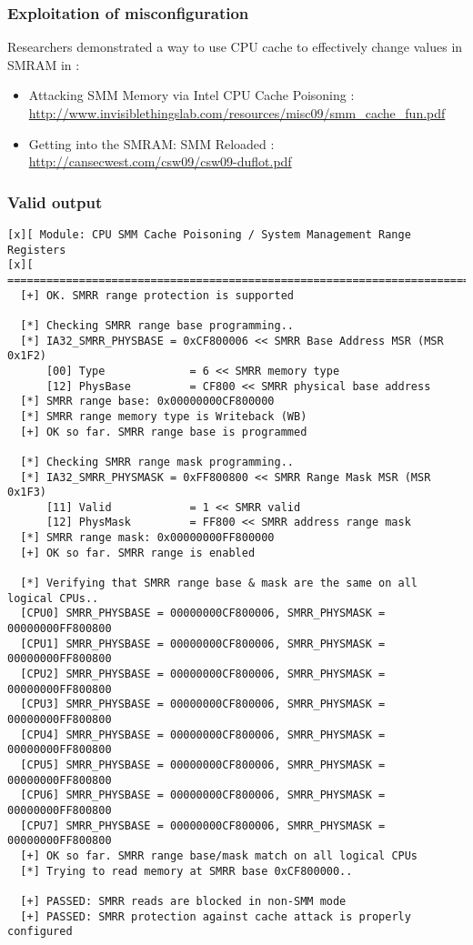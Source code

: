 \hypertarget{exploitation-of-misconfiguration-2}{%
\subsubsection{Exploitation of
misconfiguration}\label{exploitation-of-misconfiguration-2}}

Researchers demonstrated a way to use CPU cache to effectively change
values in SMRAM in :

\begin{itemize}
\tightlist
\item
  Attacking SMM Memory via Intel CPU Cache Poisoning :
  \url{http://www.invisiblethingslab.com/resources/misc09/smm_cache_fun.pdf}
\item
  Getting into the SMRAM: SMM Reloaded :
  \url{http://cansecwest.com/csw09/csw09-duflot.pdf}
\end{itemize}

\hypertarget{valid-output-6}{%
\subsubsection{Valid output}\label{valid-output-6}}

\begin{verbatim}
[x][ Module: CPU SMM Cache Poisoning / System Management Range Registers
[x][ =======================================================================
  [+] OK. SMRR range protection is supported

  [*] Checking SMRR range base programming..
  [*] IA32_SMRR_PHYSBASE = 0xCF800006 << SMRR Base Address MSR (MSR 0x1F2)
      [00] Type             = 6 << SMRR memory type 
      [12] PhysBase         = CF800 << SMRR physical base address 
  [*] SMRR range base: 0x00000000CF800000
  [*] SMRR range memory type is Writeback (WB)
  [+] OK so far. SMRR range base is programmed

  [*] Checking SMRR range mask programming..
  [*] IA32_SMRR_PHYSMASK = 0xFF800800 << SMRR Range Mask MSR (MSR 0x1F3)
      [11] Valid            = 1 << SMRR valid 
      [12] PhysMask         = FF800 << SMRR address range mask 
  [*] SMRR range mask: 0x00000000FF800000
  [+] OK so far. SMRR range is enabled

  [*] Verifying that SMRR range base & mask are the same on all logical CPUs..
  [CPU0] SMRR_PHYSBASE = 00000000CF800006, SMRR_PHYSMASK = 00000000FF800800
  [CPU1] SMRR_PHYSBASE = 00000000CF800006, SMRR_PHYSMASK = 00000000FF800800
  [CPU2] SMRR_PHYSBASE = 00000000CF800006, SMRR_PHYSMASK = 00000000FF800800
  [CPU3] SMRR_PHYSBASE = 00000000CF800006, SMRR_PHYSMASK = 00000000FF800800
  [CPU4] SMRR_PHYSBASE = 00000000CF800006, SMRR_PHYSMASK = 00000000FF800800
  [CPU5] SMRR_PHYSBASE = 00000000CF800006, SMRR_PHYSMASK = 00000000FF800800
  [CPU6] SMRR_PHYSBASE = 00000000CF800006, SMRR_PHYSMASK = 00000000FF800800
  [CPU7] SMRR_PHYSBASE = 00000000CF800006, SMRR_PHYSMASK = 00000000FF800800
  [+] OK so far. SMRR range base/mask match on all logical CPUs
  [*] Trying to read memory at SMRR base 0xCF800000..

  [+] PASSED: SMRR reads are blocked in non-SMM mode
  [+] PASSED: SMRR protection against cache attack is properly configured
\end{verbatim}

